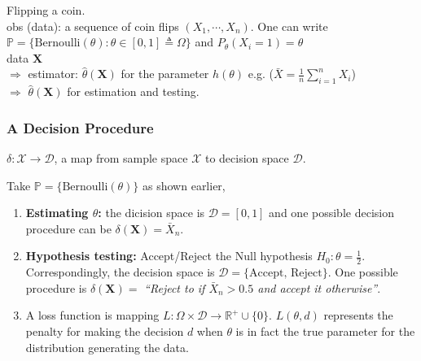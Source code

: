 \begin{example}
    Flipping a coin.\\
    
    obs (data): a sequence of coin flips $(X_1,\cdots,X_n)$. 
    One can write $\mathbb{P}=\{\text{Bernoulli}(\theta): \theta\in[0,1]\triangleq\Omega\}$ and $P_\theta(X_i=1)=\theta$\\
    
    data $\boldsymbol{X}$\\
    $\Rightarrow$ estimator: $\hat{\theta}(\boldsymbol{X})$ for the parameter $h(\theta)$ 
    {\color{gray} e.g. ($\bar{X}=\frac{1}{n}\sum_{i=1}^nX_i$)}\\
    $\Rightarrow$ $\hat{\theta}(\boldsymbol{X})$ for estimation and testing.
\end{example}

\subsubsection{A Decision Procedure}
\begin{definition}[Estimator]
    $\delta:\mathcal{X}\to\mathcal{D}$, 
    a map from sample space $\mathcal{X}$ to decision space $\mathcal{D}$.
\end{definition}

\begin{example}
    Take $\mathbb{P}=\{\text{Bernoulli}(\theta)\}$ as shown earlier,
    \begin{enumerate}
        \item \textbf{Estimating $\theta$:} 
        the dicision space is $\mathcal{D}=[0,1]$ and 
        one possible decision procedure can be 
        $\delta(\boldsymbol{X})=\bar{X}_n$.
        \item \textbf{Hypothesis testing:} 
        Accept/Reject the Null hypothesis $H_0:\theta=\frac{1}{2}$. 
        Correspondingly, the decision space is $\mathcal{D}=\{\text{Accept, Reject}\}$.
        One possible procedure is $\delta(\boldsymbol{X})=$
        \textit{``Reject to if $\bar{X}_n > 0.5$ and accept it otherwise''}.
        \item A loss function is mapping $L: \Omega\times\mathcal{D} \to \mathbb{R}^+\cup{\{0\}}$.
        $L(\theta, d)$  represents the penalty for making the decision $d$ 
        when $\theta$ is in fact the true parameter for the distribution generating the data.
    \end{enumerate}
\end{example}

